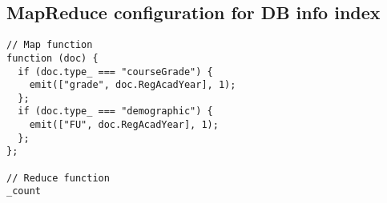 \subsection{MapReduce configuration for DB info index}
\label{appendix:dbInfo}
\begin{verbatim}
// Map function
function (doc) {
  if (doc.type_ === "courseGrade") {
    emit(["grade", doc.RegAcadYear], 1);  
  };
  if (doc.type_ === "demographic") {
    emit(["FU", doc.RegAcadYear], 1);
  };
};

// Reduce function
_count
\end{verbatim}